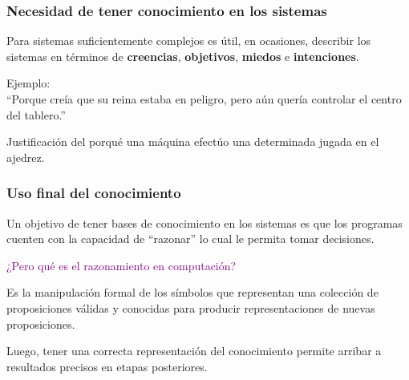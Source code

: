 \documentclass[
10pt, %
aspectratio=169, %
]{beamer}
\begin{document}
	
	\begin{frame}
		
		\frametitle{Necesidad de tener conocimiento en los sistemas}
		
		Para sistemas suficientemente complejos es útil, en ocasiones, describir los sistemas en términos de \textbf{creencias}, \textbf{objetivos}, \textbf{miedos} e \textbf{intenciones}.
		
		\vspace{2\baselineskip}
		Ejemplo: \\
			\hspace{2mm} ``Porque creía que su reina estaba en peligro, pero aún quería controlar el centro del tablero.''
			
		\vspace{1\baselineskip}
		\hspace{2mm} Justificación del porqué una máquina efectúo una determinada jugada en el ajedrez.
		
	\end{frame}
	
	\begin{frame}
		
		\frametitle{Uso final del conocimiento}
		
		Un objetivo de tener bases de conocimiento en los sistemas es que los programas cuenten con la capacidad de ``razonar'' lo cual le permita tomar decisiones.
		
		\pause
		\vspace{2\baselineskip}
		\textcolor{purple}{¿Pero qué es el razonamiento en computación?}
				
		\pause
		\begin{alertblock}{}
			Es la manipulación formal de los símbolos que representan una colección de proposiciones válidas y conocidas para producir representaciones de nuevas proposiciones. 
		\end{alertblock}
		
		\pause
		\vspace{2\baselineskip}
		Luego, tener una correcta representación del conocimiento permite arribar a resultados precisos en etapas posteriores.
		
	\end{frame}
	
\end{document}
